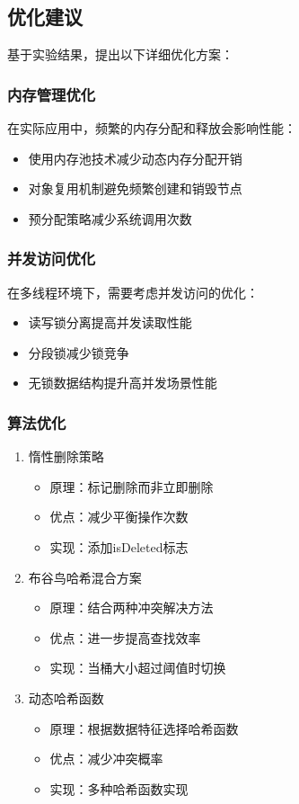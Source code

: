 \documentclass[12pt,a4paper]{article}
\begin{document}
\subsection{优化建议}
基于实验结果，提出以下详细优化方案：

\subsubsection{内存管理优化}
在实际应用中，频繁的内存分配和释放会影响性能：
\begin{itemize}
\item 使用内存池技术减少动态内存分配开销
\item 对象复用机制避免频繁创建和销毁节点
\item 预分配策略减少系统调用次数
\end{itemize}

\subsubsection{并发访问优化}
在多线程环境下，需要考虑并发访问的优化：
\begin{itemize}
\item 读写锁分离提高并发读取性能
\item 分段锁减少锁竞争
\item 无锁数据结构提升高并发场景性能
\end{itemize}

\subsubsection{算法优化}
\begin{enumerate}
\item 惰性删除策略
\begin{itemize}
\item 原理：标记删除而非立即删除
\item 优点：减少平衡操作次数
\item 实现：添加isDeleted标志
\end{itemize}

\item 布谷鸟哈希混合方案
\begin{itemize}
\item 原理：结合两种冲突解决方法
\item 优点：进一步提高查找效率
\item 实现：当桶大小超过阈值时切换
\end{itemize}

\item 动态哈希函数
\begin{itemize}
\item 原理：根据数据特征选择哈希函数
\item 优点：减少冲突概率
\item 实现：多种哈希函数实现
\end{itemize}
\end{enumerate}
\end{document}
